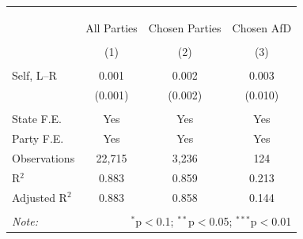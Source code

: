 
\begin{table}[!htbp] \centering 
  \caption{} 
  \label{} 
\begin{tabular}{@{\extracolsep{5pt}}lccc} 
\\[-1.8ex]\hline 
\hline \\[-1.8ex] 
\\[-1.8ex] & \multicolumn{3}{c}{} \\ 
 & All Parties & Chosen Parties & Chosen AfD \\ 
\\[-1.8ex] & (1) & (2) & (3)\\ 
\hline \\[-1.8ex] 
 Self, L--R & 0.001 & 0.002 & 0.003 \\ 
  & (0.001) & (0.002) & (0.010) \\ 
 \hline \\[-1.8ex] 
State F.E. & Yes & Yes & Yes \\ 
Party F.E. & Yes & Yes & Yes \\ 
Observations & 22,715 & 3,236 & 124 \\ 
R$^{2}$ & 0.883 & 0.859 & 0.213 \\ 
Adjusted R$^{2}$ & 0.883 & 0.858 & 0.144 \\ 
\hline 
\hline \\[-1.8ex] 
\textit{Note:}  & \multicolumn{3}{r}{$^{*}$p$<$0.1; $^{**}$p$<$0.05; $^{***}$p$<$0.01} \\ 
\end{tabular} 
\end{table} 
